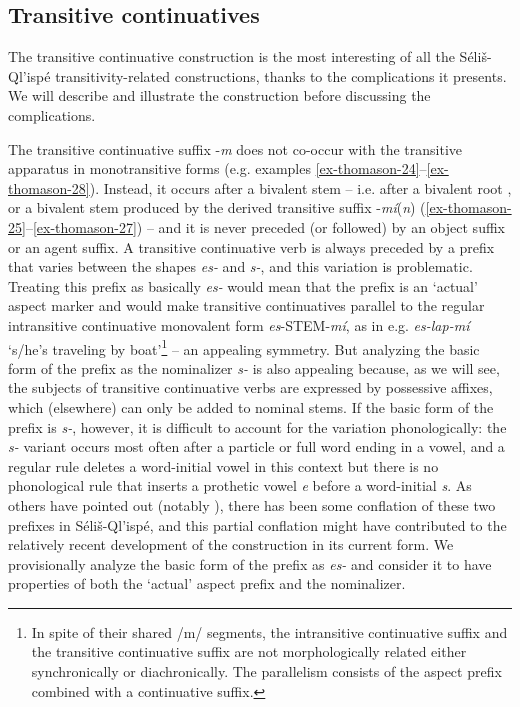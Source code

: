 \documentclass[output=paper,colorlinks,citecolor=brown]{langscibook}
\begin{document}
\subsection{Transitive continuatives}  %
\label{thomason_section_2.6}

The transitive continuative construction is the most interesting of
all the S\'eli\v{s}-Ql'isp\'e transitivity-related constructions,
thanks to the complications it presents.  We will describe and
illustrate the construction before discussing the complications.

The transitive continuative suffix -\emph{m} does not co-occur with
the transitive apparatus in monotransitive forms (e.g.  examples \ref{ex-thomason-24}--\ref{ex-thomason-28}).
Instead, it occurs after a bivalent stem -- i.e. after a bivalent root
,  or a bivalent stem produced by the derived transitive suffix
-\emph{m\'i}(\emph{n}) (\ref{ex-thomason-25}--\ref{ex-thomason-27}) -- and it is never preceded (or
followed) by an object suffix or an agent suffix.  A transitive
continuative verb is always preceded by a prefix that varies between
the shapes \emph{es-} and \emph{s-}, and this variation is
problematic.  Treating this prefix as basically \emph{es-} would mean
that the prefix is an `actual' aspect marker and would make transitive
continuatives parallel to the regular intransitive continuative
monovalent form \emph{es}-STEM-\emph{m\'i}, as in
e.g. \emph{es-lap-m\'i} `s/he's traveling by boat'\footnote{In spite
of their shared /m/ segments, the intransitive continuative suffix and
the transitive continuative suffix are not morphologically related
either synchronically or diachronically. The parallelism consists of
the aspect prefix combined with a continuative suffix.  } -- an
appealing symmetry.  But analyzing the basic form of the prefix as the
nominalizer \emph{s-} is also appealing because, as we will see, the
subjects of transitive continuative verbs are expressed by possessive
affixes, which (elsewhere) can only be added to nominal stems.  If the
basic form of the prefix is \emph{s-}, however, it is difficult to
account for the variation phonologically: the \emph{s-} variant occurs
most often after a particle or full word ending in a vowel, and a
regular rule deletes a word-initial vowel in this context but there
is no phonological rule that inserts a prothetic vowel \emph{e} before
a word-initial \emph{s}.  As others have pointed out (notably
\citealt{Kroeber:1999}), there has been some conflation of these two
prefixes in S\'eli\v{s}-Ql'isp\'e, and this partial conflation might
have contributed to the relatively recent development of the
construction in its current form.  We provisionally analyze the basic
form of the prefix as \emph{es-} and consider it to have properties of
both the `actual' aspect prefix and the nominalizer.
\end{document}
